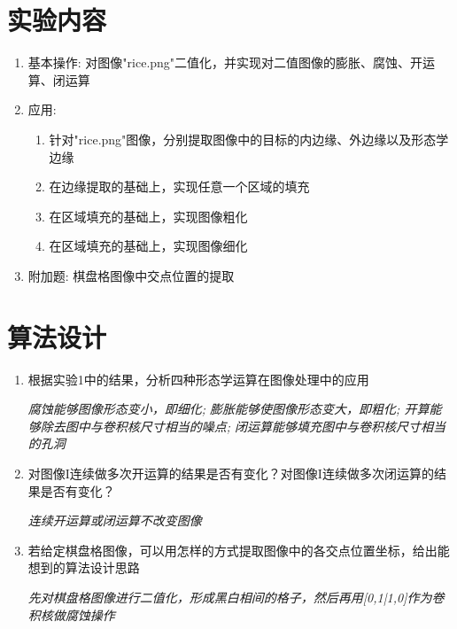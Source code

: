 \documentclass[a4paper]{ctexart}
\begin{document}
  \section{实验内容}
  \begin{enumerate}
    \item 基本操作: 对图像"rice.png"二值化，并实现对二值图像的膨胀、腐蚀、开运算、闭运算
    \item 应用:
    \begin{enumerate}
      \item 针对"rice.png"图像，分别提取图像中的目标的内边缘、外边缘以及形态学边缘
      \item 在边缘提取的基础上，实现任意一个区域的填充
      \item 在区域填充的基础上，实现图像粗化
      \item 在区域填充的基础上，实现图像细化
    \end{enumerate}
    \item 附加题: 棋盘格图像中交点位置的提取
  \end{enumerate}

  \section{算法设计}
  \begin{enumerate}
    \item 根据实验1中的结果，分析四种形态学运算在图像处理中的应用

    \textit{腐蚀能够图像形态变小，即细化; 膨胀能够使图像形态变大，即粗化;
    开算能够除去图中与卷积核尺寸相当的噪点; 闭运算能够填充图中与卷积核尺寸相当的孔洞}

    \item 对图像I连续做多次开运算的结果是否有变化？对图像I连续做多次闭运算的结果是否有变化？

    \textit{连续开运算或闭运算不改变图像}

    \item 若给定棋盘格图像，可以用怎样的方式提取图像中的各交点位置坐标，给出能想到的算法设计思路

    \textit{先对棋盘格图像进行二值化，形成黑白相间的格子，然后再用[0,1|1,0]作为卷积核做腐蚀操作}
  \end{enumerate}
\end{document}
